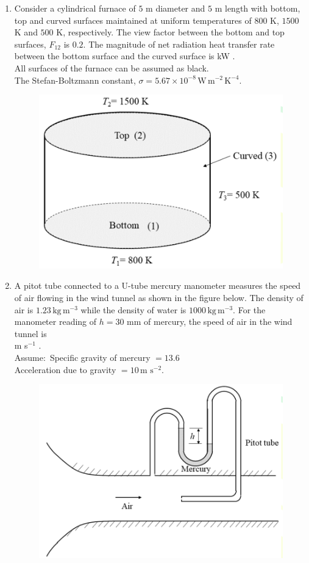 \documentclass[journal]{IEEEtran}
\begin{document}
\begin{enumerate}[leftmargin=0pt]
\item
Consider a cylindrical furnace of $5$ m diameter and $5$ m length with bottom, top and curved surfaces maintained at uniform temperatures of $800$ K, $1500$ K and $500$ K, respectively. The view factor between the bottom and top surfaces, $F_{12}$ is $0.2$. The magnitude of net radiation heat transfer rate between the bottom surface and the curved surface is \underline{\hspace{2cm}} kW .\\
All surfaces of the furnace can be assumed as black.\\
The Stefan-Boltzmann constant, $\sigma = 5.67\times 10^{-8}\,\text{W}\,\text{m}^{-2}\,\text{K}^{-4}$.
\begin{figure}[H]\includegraphics[width=0.5\columnwidth]{Figs/image - 2025-08-24T165555.549.png}\caption*{}\label{fig:q48}\end{figure}
\hfill{}

\item
A pitot tube connected to a U-tube mercury manometer measures the speed of air flowing in the wind tunnel as shown in the figure below. The density of air is $1.23\,\text{kg}\,\text{m}^{-3}$ while the density of water is $1000\,\text{kg}\,\text{m}^{-3}$. For the manometer reading of $h = 30$ mm of mercury, the speed of air in the wind tunnel is\\
\underline{\hspace{2cm}} m s$^{-1}$ .\\
Assume$\colon$ Specific gravity of mercury $=13.6$\\
Acceleration due to gravity $=10\,\text{m s}^{-2}$.
\begin{figure}[H]\includegraphics[width=0.5\columnwidth]{Figs/image - 2025-08-24T165912.948.png}\caption*{}\label{fig:q49}\end{figure}
\hfill{}


\end{enumerate}
\end{document}
